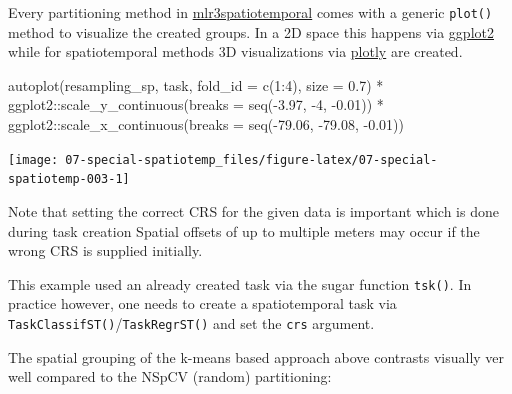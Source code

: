 \documentclass[
]{scrbook}
\newenvironment{Shaded}{\begin{snugshade}}{\end{snugshade}}
\newcommand{\AttributeTok}[1]{\textcolor[rgb]{0.77,0.63,0.00}{#1}}
\newcommand{\DecValTok}[1]{\textcolor[rgb]{0.00,0.00,0.81}{#1}}
\newcommand{\FloatTok}[1]{\textcolor[rgb]{0.00,0.00,0.81}{#1}}
\newcommand{\FunctionTok}[1]{\textcolor[rgb]{0.00,0.00,0.00}{#1}}
\newcommand{\NormalTok}[1]{#1}
\newcommand{\SpecialCharTok}[1]{\textcolor[rgb]{0.00,0.00,0.00}{#1}}
\renewenvironment{Shaded} {\begin{snugshade}\small} {\end{snugshade}}
\begin{document}
Every partitioning method in \href{https://github.com/mlr-org/mlr3spatiotemporal}{mlr3spatiotemporal} comes with a generic \texttt{plot()} method to visualize the created groups.
In a 2D space this happens via \href{https://cran.r-project.org/package=ggplot2}{ggplot2} while for spatiotemporal methods 3D visualizations via \href{https://cran.r-project.org/package=plotly}{plotly} are created.

\begin{Shaded}
\begin{Highlighting}[]
\FunctionTok{autoplot}\NormalTok{(resampling\_sp, task, }\AttributeTok{fold\_id =} \FunctionTok{c}\NormalTok{(}\DecValTok{1}\SpecialCharTok{:}\DecValTok{4}\NormalTok{), }\AttributeTok{size =} \FloatTok{0.7}\NormalTok{) }\SpecialCharTok{*}
\NormalTok{  ggplot2}\SpecialCharTok{::}\FunctionTok{scale\_y\_continuous}\NormalTok{(}\AttributeTok{breaks =} \FunctionTok{seq}\NormalTok{(}\SpecialCharTok{{-}}\FloatTok{3.97}\NormalTok{, }\SpecialCharTok{{-}}\DecValTok{4}\NormalTok{, }\SpecialCharTok{{-}}\FloatTok{0.01}\NormalTok{)) }\SpecialCharTok{*}
\NormalTok{  ggplot2}\SpecialCharTok{::}\FunctionTok{scale\_x\_continuous}\NormalTok{(}\AttributeTok{breaks =} \FunctionTok{seq}\NormalTok{(}\SpecialCharTok{{-}}\FloatTok{79.06}\NormalTok{, }\SpecialCharTok{{-}}\FloatTok{79.08}\NormalTok{, }\SpecialCharTok{{-}}\FloatTok{0.01}\NormalTok{))}
\end{Highlighting}
\end{Shaded}

\begin{center}\texttt{[image: 07-special-spatiotemp\_files/figure-latex/07-special-spatiotemp-003-1]} \end{center}

Note that setting the correct CRS for the given data is important which is done during task creation
Spatial offsets of up to multiple meters may occur if the wrong CRS is supplied initially.

This example used an already created task via the sugar function \texttt{tsk()}.
In practice however, one needs to create a spatiotemporal task via \texttt{TaskClassifST()}/\texttt{TaskRegrST()} and set the \texttt{crs} argument.

The spatial grouping of the k-means based approach above contrasts visually ver well compared to the NSpCV (random) partitioning:
\end{document}
